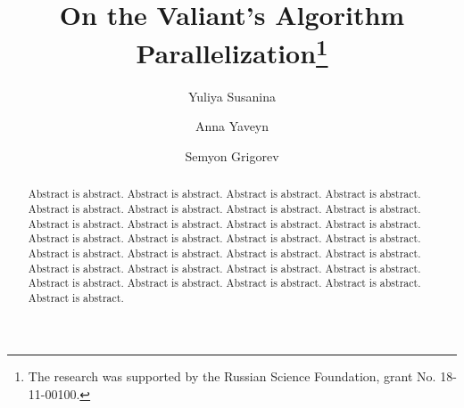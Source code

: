 \documentclass[runningheads]{llncs}
\begin{document}
%
\title{On the Valiant's Algorithm Parallelization\thanks{The research was supported by the Russian Science Foundation, grant No. 18-11-00100.}}
%
%
\author{Yuliya Susanina \and
Anna Yaveyn \and
Semyon Grigorev}
%
%
%
\maketitle              %
%
\begin{abstract}
Abstract is abstract. Abstract is abstract. Abstract is abstract. Abstract is abstract. Abstract is abstract. Abstract is abstract. Abstract is abstract. Abstract is abstract. Abstract is abstract. Abstract is abstract. Abstract is abstract. Abstract is abstract. Abstract is abstract. Abstract is abstract. Abstract is abstract. Abstract is abstract. Abstract is abstract. Abstract is abstract. Abstract is abstract. Abstract is abstract. Abstract is abstract. Abstract is abstract. Abstract is abstract. Abstract is abstract. Abstract is abstract. Abstract is abstract. Abstract is abstract. Abstract is abstract. Abstract is abstract.

\end{abstract}
%
%
%







%
%
%


\end{document}

